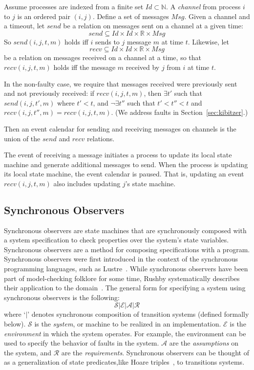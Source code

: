 \documentclass{llncs/llncs}
\newcommand{\lee}[1]{ } %
\newcommand{\lee}[1]{ {\color{blue}$<$lee: #1$>$} } %
\begin{document}
Assume processes are indexed from a finite set $Id \subset \mathbb{N}$. A \emph{channel} from process $i$ to $j$ is an ordered pair $(i,j)$. Define a set of messages $Msg$. Given a channel and a timeout, let $send$ be a relation on messages sent on a channel at a given time:
$$send \subseteq Id \times Id \times \mathbb{R} \times Msg$$
So $send(i, j, t, m)$ holds iff $i$ sends to $j$ message $m$ at time $t$. Likewise, let
$$recv \subseteq Id \times Id \times \mathbb{R} \times Msg$$
be a relation on messages received on a channel at a time, so that $recv(i, j, t, m)$ holds iff the message $m$ received by $j$ from $i$ at time $t$.

In the non-faulty case, we require that messages received were previously sent and not previously received: if $recv(i, j, t, m)$, then $\exists t'$ such that $send(i, j, t', m)$ where $t' < t$, and $\neg\exists t''$ such that $t' < t'' < t$ and $recv(i, j, t'', m) = recv(i, j, t, m)$. (We address faults in Section~\ref{sec:kibitzer}.)

Then an event calendar for sending and receiving messages on channels is the union of the $send$ and $recv$ relations.

\lee{technically, atomic time is just a convenience.}
The event of receiving a message initiates a process to update its local state machine and generate additional messages to send. When the process is updating its local state machine, the event calendar is paused. That is, updating an event $recv(i, j, t, m)$ also includes updating $j$'s state machine.

\lee{note that we don't need full generality of send and receive events in OM(1)}

\subsection{Synchronous Observers}\label{sec:sync}
Synchronous observers are state machines that are synchronously composed with a system specification to check properties over the system's state variables. Synchronous observers are a method for composing specifications with a program. Synchronous observers were first introduced in the context of the synchronous programming languages, such as Lustre~\cite{}. While synchronous observers have been part of model-checking folklore for some time, Rushby systematically describes their application to the domain~\cite{}. The general form for specifying a system using synchronous observers is the following:
$$\mathcal{S} | \mathcal{E} | \mathcal{A} | \mathcal{R}$$
\noindent
where `$|$' denotes synchronous composition of transition systems (defined formally below). $\mathcal{S}$ is the \emph{system}, or machine to be realized in an implementation. $\mathcal{E}$ is the \emph{environment} in which the system operates. For example, the environment can be used to specify the behavior of faults in the system. $\mathcal{A}$ are the \emph{assumptions} on the system, and $\mathcal{R}$ are the \emph{requirements}. Synchronous observers can be thought of as a generalization of state predicates,like Hoare triples~\cite{}, to transitions systems.
\end{document}
